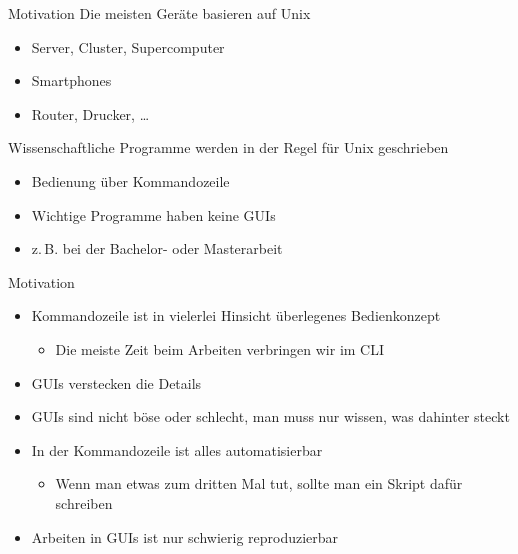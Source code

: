 \tabulinesep=4pt






\begin{frame}{Motivation}
  Die meisten Geräte basieren auf Unix
  \begin{itemize}
    \item Server, Cluster, Supercomputer
    \item Smartphones
    \item Router, Drucker, …
  \end{itemize}
  Wissenschaftliche Programme werden in der Regel für Unix geschrieben
  \begin{itemize}
    \item Bedienung über Kommandozeile
    \item Wichtige Programme haben keine GUIs
    \item z.\,B. bei der Bachelor- oder Masterarbeit
  \end{itemize}
\end{frame}

\begin{frame}{Motivation}
  \begin{itemize}
    \item Kommandozeile ist in vielerlei Hinsicht überlegenes Bedienkonzept
      \begin{itemize}
        \item Die meiste Zeit beim Arbeiten verbringen wir im CLI
      \end{itemize}
    \item GUIs verstecken die Details
    \item GUIs sind nicht böse oder schlecht, man muss nur wissen, was dahinter steckt
    \item In der Kommandozeile ist alles automatisierbar
      \begin{itemize}
        \item Wenn man etwas zum dritten Mal tut, sollte man ein Skript dafür schreiben
      \end{itemize}
    \item Arbeiten in GUIs ist nur schwierig reproduzierbar
  \end{itemize}
\end{frame}


